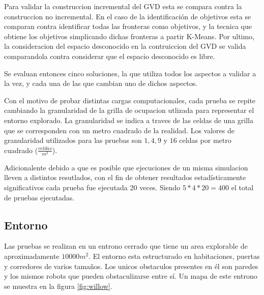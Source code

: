 Para validar la construccion incremental del GVD esta se compara contra la
construccion no incremental. En el caso de la identificación de objetivos esta se
comparan contra identificar todas las fronteras como objetivos, y la tecnica
que obtiene los objetivos simplicando dichas fronteras a partir K-Means. Por
ultimo, la consideracion del espacio desconocido en la contruiccion del GVD se
valida comparandola contra considerar que el espacio desconocido es libre. 

Se evaluan entonces cinco soluciones, la que utiliza todos los aspectos a
validar a la vez, y cada una de las que cambian uno de dichos aspectos.

Con el motivo de probar distintas cargas computacionales, cada prueba se repite
cambiando la granularidad de la grilla de ocupacion utlizada para representar
el entorno explorado. La granularidad se indica a traves de las celdas de una
grilla que se corresponden con un metro cuadrado de la realidad. Los valores de
granularidad utilizados para las pruebas son $1,4,9$ y $16$ celdas
por metro cuadrado ($\frac{celdas}{m^2}$). 

Adicionalente debido a que es posible que ejecuciones de un misma simulacion
lleven a distintos resutlados, con el fin de obtener resultados
estadísticamente significativos cada prueba fue ejecutada 20 veces. Siendo 
$5*4*20=400$ el total de pruebas ejecutadas.


\subsection{Entorno}
Las pruebas se realizan en un entrono cerrado que tiene un area explorable de
aproximadamente $10000m^2$. El entorno esta estructurado en habitaciones,
puertas y corredores de varios tamaños. Los unicos obstaculos presentes en él
son paredes y los mismos robots que pueden obstaculizarse entre
sí. Un mapa de este entrono se muestra en la figura
\ref{fig:willow}.

